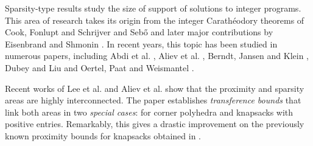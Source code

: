 \documentclass[runningheads]{llncs}
\newcommand{\ve}{\boldsymbol}
\newcommand{\be}{\begin{eqnarray}}
\newcommand{\bea}{\begin{eqnarray*}}
\newcommand{\ee}{\end{eqnarray}}
\newcommand{\eea}{\end{eqnarray*}}
\newcommand{\KP}{{P}}
\renewcommand\>{\rangle}
\newcommand\<{\langle}
\newcommand\0{\mathbf{0}}
\newcommand\CP{{C}}
\newcommand\BB{\ve B}%
\renewcommand\AA{\ve A}%
\begin{document}
Sparsity-type results study the size of support of solutions to integer programs. This area of research takes its origin from the integer Carath\'eodory theorems of Cook, Fonlupt and Schrijver \cite{MR830593} and Seb\H{o} \cite{Sebo} and later major contributions by Eisenbrand and Shmonin \cite{EisenbrandShmonin2006}.  In recent years, this topic has been studied in numerous papers, including Abdi et al. \cite{ACGT}, Aliev et al. \cite{AADO,Support,ADON2017}, Berndt, Jansen and Klein \cite{BJK}, Dubey and Liu \cite{DL} and Oertel, Paat and Weismantel \cite{OPW}.  

Recent works of Lee et al. \cite{LPSX} and Aliev et al. \cite{ACHW} show that the proximity and sparsity areas are highly interconnected. The paper \cite{ACHW} establishes {\em transference bounds} that link both areas in two {\em special cases}: for  corner polyhedra and knapsacks with positive entries. Remarkably, this gives a drastic improvement on the previously known proximity bounds for knapsacks obtained in \cite{AHO}. 



\end{document}
